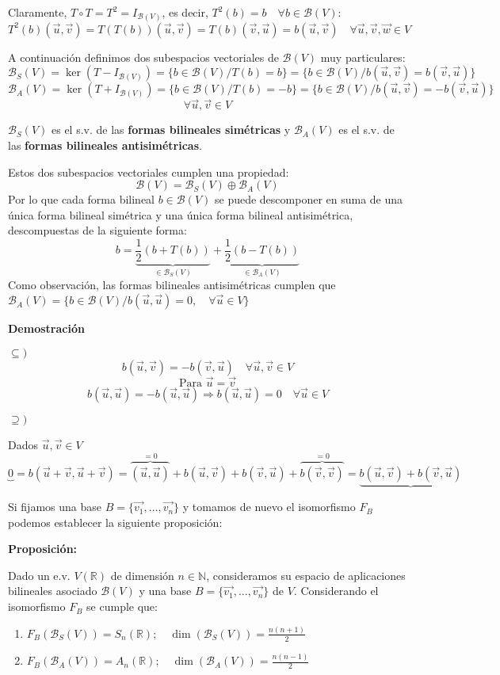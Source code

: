 \documentclass[x11names,table]{report}
\begin{document}
Claramente, $T\circ T=T^2=I_{\mathcal{B}(V)}$, es decir, $T^2(b)=b\quad \forall b\in\mathcal{B}(V)$:
\[
T^2(b)(\vec{u},\vec{v})=T(T(b))(\vec{u},\vec{v})=T(b)(\vec{v},\vec{u})=b(\vec{u},\vec{v})\quad \forall \vec{u},\vec{v},\vec{w}\in V
\]

A continuación definimos dos subespacios vectoriales de $\mathcal{B}(V)$ muy particulares:
\[
\mathcal{B}_S(V)=\ker(T-I_{\mathcal{B}(V)})=\{b\in\mathcal{B}(V)/T(b)=b\}=\{b\in\mathcal{B}(V)/b(\vec{u},\vec{v})=b(\vec{v},\vec{u})\}\]\[
\mathcal{B}_A(V)=\ker(T+I_{\mathcal{B}(V)})=\{b\in\mathcal{B}(V)/T(b)=-b\}=\{b\in\mathcal{B}(V)/b(\vec{u},\vec{v})=-b(\vec{v},\vec{u})\}
\]\[\forall \vec{u},\vec{v}\in V\]

$\mathcal{B}_S(V)$ es el s.v. de las \textbf{formas bilineales simétricas} y $\mathcal{B}_A(V)$ es el s.v. de las \textbf{formas bilineales antisimétricas}.

Estos dos subespacios vectoriales cumplen una propiedad:
\[
\mathcal{B}(V)=\mathcal{B}_S(V)\oplus\mathcal{B}_A(V)
\]
Por lo que cada forma bilineal $b\in\mathcal{B}(V)$ se puede descomponer en suma de una única forma bilineal simétrica y una única forma bilineal antisimétrica, descompuestas de la siguiente forma:
\[
b=\underbrace{\frac{1}{2}(b+T(b))}_{\in \mathcal{B}_S(V)}+\underbrace{\frac{1}{2}(b-T(b))}_{\in \mathcal{B}_A(V)}
\]
Como observación, las formas bilineales antisimétricas cumplen que $\mathcal{B}_A(V)=\{b\in\mathcal{B}(V)/b(\vec{u},\vec{u})=0,\quad \forall \vec{u}\in V\}$

\textbf{Demostración}

$\subseteq)$
\[
b(\vec{u},\vec{v})=-b(\vec{v},\vec{u})\quad\forall \vec{u},\vec{v}\in V\]\[
\text{Para }\vec{u}=\vec{v}\]\[ b(\vec{u},\vec{u})=-b(\vec{u},\vec{u})\Rightarrow b(\vec{u},\vec{u})=0\quad\forall \vec{u}\in V\]


$\supseteq)$

Dados $\vec{u},\vec{v}\in V$
\[\underbrace{0}=b(\vec{u}+\vec{v},\vec{u}+\vec{v})=\overbrace{(\vec{u},\vec{u})}^{=0}+b(\vec{u},\vec{v})+b(\vec{v},\vec{u})+\overbrace{b(\vec{v},\vec{v})}^{=0}=\underbrace{b(\vec{u},\vec{v})+b(\vec{v},\vec{u})}\]

Si fijamos una base $B=\{\vec{v_1},\dots,\vec{v_n}\}$ y tomamos de nuevo el isomorfismo $F_B$ podemos establecer la siguiente proposición:

\textbf{Proposición:}

Dado un e.v. $V(\mathbb{R})$ de dimensión $n\in\mathbb{N}$, consideramos su espacio de aplicaciones bilineales asociado $\mathcal{B}(V)$ y una base $B=\{\vec{v_1},\dots,\vec{v_n}\}$ de $V$. Considerando el isomorfismo $F_B$ se cumple que:
\begin{enumerate}
\item $F_B(\mathcal{B}_S(V))=S_n(\mathbb{R});\quad \dim(\mathcal{B}_S(V))=\frac{n(n+1)}{2}$
\item $F_B(\mathcal{B}_A(V))=A_n(\mathbb{R});\quad \dim(\mathcal{B}_A(V))=\frac{n(n-1)}{2}$
\end{enumerate}
\end{document}
